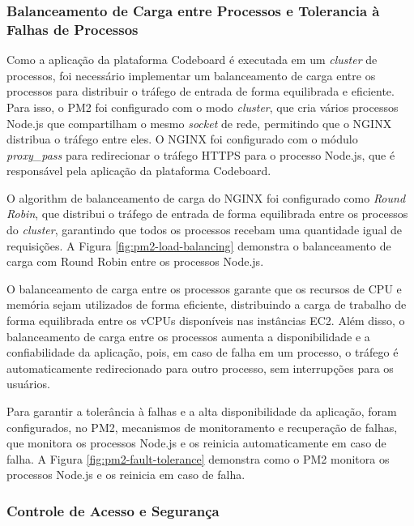 \subsubsection{Balanceamento de Carga entre Processos e Tolerancia à Falhas de Processos}

Como a aplicação da plataforma Codeboard é executada em um \emph{cluster} de processos, foi necessário implementar um balanceamento de carga entre os processos para distribuir o tráfego de entrada de forma equilibrada e eficiente. Para isso, o PM2 foi configurado com o modo \emph{cluster}, que cria vários processos Node.js que compartilham o mesmo \emph{socket} de rede, permitindo que o NGINX distribua o tráfego entre eles. O NGINX foi configurado com o módulo \emph{proxy\_pass} para redirecionar o tráfego HTTPS para o processo Node.js, que é responsável pela aplicação da plataforma Codeboard. 

O algorithm de balanceamento de carga do NGINX foi configurado como \emph{Round Robin}, que distribui o tráfego de entrada de forma equilibrada entre os processos do \emph{cluster}, garantindo que todos os processos recebam uma quantidade igual de requisições. A Figura \ref{fig:pm2-load-balancing} demonstra o balanceamento de carga com Round Robin entre os processos Node.js.


O balanceamento de carga entre os processos garante que os recursos de CPU e memória sejam utilizados de forma eficiente, distribuindo a carga de trabalho de forma equilibrada entre os vCPUs disponíveis nas instâncias EC2. Além disso, o balanceamento de carga entre os processos aumenta a disponibilidade e a confiabilidade da aplicação, pois, em caso de falha em um processo, o tráfego é automaticamente redirecionado para outro processo, sem interrupções para os usuários.

Para garantir a tolerância à falhas e a alta disponibilidade da aplicação, foram configurados, no PM2, mecanismos de monitoramento e recuperação de falhas, que monitora os processos Node.js e os reinicia automaticamente em caso de falha. A Figura \ref{fig:pm2-fault-tolerance} demonstra como o PM2 monitora os processos Node.js e os reinicia em caso de falha.


\subsubsection{Controle de Acesso e Segurança}

